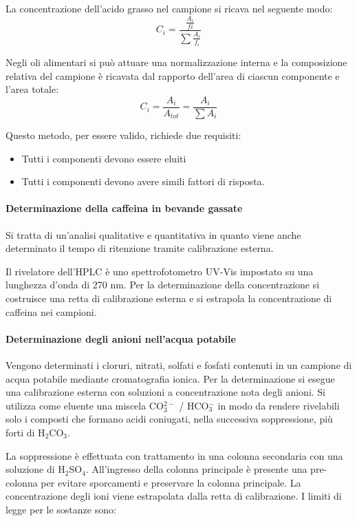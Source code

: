 La concentrazione dell'acido grasso nel campione si ricava nel seguente modo:
\[
C_i = \frac{\frac{A_i}{fi}}{\sum \frac{A_i}{f_i}}
\]

Negli oli alimentari si può attuare una normalizzazione interna e la composizione relativa del campione è ricavata dal rapporto dell'area di ciascun componente e l'area totale:
\[
C_i = \frac{A_i}{A_{tot}} = \frac{A_i}{\sum A_i}
\]

Questo metodo, per essere valido, richiede due requisiti:
\begin{itemize}
\item Tutti i componenti devono essere eluiti
\item Tutti i componenti devono avere simili fattori di risposta.
\end{itemize}

\paragraph{Determinazione della caffeina in bevande gassate}
Si tratta di un'analisi qualitative e quantitativa in quanto viene anche determinato il tempo di ritenzione tramite calibrazione esterna.


Il rivelatore dell'HPLC è uno spettrofotometro UV-Vis impostato su una lunghezza d'onda di 270 nm.
Per la determinazione della concentrazione si costruisce una retta di calibrazione esterna e si estrapola la concentrazione di caffeina nei campioni.

\paragraph{Determinazione degli anioni nell'acqua potabile}
Vengono determinati i cloruri, nitrati, solfati e fosfati contenuti in un campione di acqua potabile mediante cromatografia ionica.
Per la determinazione si esegue una calibrazione esterna con soluzioni a concentrazione nota degli anioni.
Si utilizza come eluente una miscela CO$_3^{2-}$ / HCO$_3^-$ in modo da rendere rivelabili solo i composti che formano acidi coniugati, nella successiva soppressione, più forti di H$_2$CO$_3$.


La soppressione è effettuata con trattamento in una colonna secondaria con una soluzione di H$_2$SO$_4$.
All'ingresso della colonna principale è presente una pre-colonna per evitare sporcamenti e preservare la colonna principale.
La concentrazione degli ioni viene estrapolata dalla retta di calibrazione. I limiti di legge per le sostanze sono:

